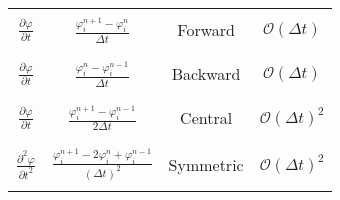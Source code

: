 \documentclass[12pts,a4paper,amsmath,amssymb,floatfix]{article}%
\renewcommand\phi{\varphi}
\newcommand{\frc}{\displaystyle\frac}
\begin{document}
\begin{center}
\begin{longtable}{|| c | c | c | c ||}
& & & \\
$\frc{\partial\phi}{\partial t}$ & $\frc{\phi_{i}^{n+1}-\phi_{i}^{n}}{\Delta t}$ & Forward & $\mathcal{O}\left(\Delta t\right)$  \\ 
& & & \\
\hline
& & & \\
$\frc{\partial\phi}{\partial t}$ & $\frc{\phi_{i}^{n}-\phi_{i}^{n-1}}{\Delta t}$ & Backward & $\mathcal{O}\left(\Delta t\right)$  \\ 
& & & \\
\hline
& & & \\
$\frc{\partial\phi}{\partial t}$ & $\frc{\phi_{i}^{n+1}-\phi_{i}^{n-1}}{2\Delta t}$ & Central & $\mathcal{O}\left(\Delta t\right)^{2}$  \\ 
& & & \\
\hline
& & & \\
$\frc{\partial^{2}\phi}{\partial t^{2}}$ & $\frc{\phi_{i}^{n+1}-2\phi_{i}^{n}+\phi_{i}^{n-1}}{\left(\Delta t\right)^{2}}$ & Symmetric & $\mathcal{O}\left(\Delta t\right)^{2}$  \\ 
& & & \\
\hline


\hline\hline

\end{longtable}
\end{center}
\end{document}
